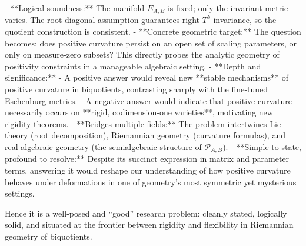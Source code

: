 - **Logical soundness:** The manifold \(E_{A,B}\) is fixed; only the invariant metric varies.  The root‑diagonal assumption guarantees right‑\(T^k\)-invariance, so the quotient construction is consistent.  
- **Concrete geometric target:** The question becomes: does positive curvature persist on an open set of scaling parameters, or only on measure‑zero subsets?  This directly probes the analytic geometry of positivity constraints in a manageable algebraic setting.  
- **Depth and significance:**  
  - A positive answer would reveal new **stable mechanisms** of positive curvature in biquotients, contrasting sharply with the fine‑tuned Eschenburg metrics.  
  - A negative answer would indicate that positive curvature necessarily occurs on **rigid, codimension‑one varieties**, motivating new rigidity theorems.  
- **Bridges multiple fields:** The problem intertwines Lie theory (root decomposition), Riemannian geometry (curvature formulas), and real‑algebraic geometry (the semialgebraic structure of \(\mathcal{P}_{A,B}\)).  
- **Simple to state, profound to resolve:** Despite its succinct expression in matrix and parameter terms, answering it would reshape our understanding of how positive curvature behaves under deformations in one of geometry’s most symmetric yet mysterious settings.

Hence it is a well‑posed and “good” research problem: cleanly stated, logically solid, and situated at the frontier between rigidity and flexibility in Riemannian geometry of biquotients.